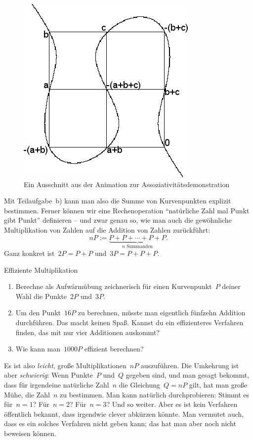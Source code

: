 \documentclass{zirkelblatt}
\begin{document}
\begin{figure}[t]
  \centering
  \includegraphics[scale=0.4]{elliptic-curve-associativity}
  \caption{Ein Ausschnitt aus der Animation zur Assoziativitätsdemonstration}
\end{figure}

Mit Teilaufgabe~b) kann man also die Summe von Kurvenpunkten explizit
bestimmen. Ferner können wir eine Rechenoperation "`natürliche Zahl mal Punkt
gibt Punkt"' definieren -- und zwar genau so, wie man auch die gewöhnliche
Multiplikation von Zahlen auf die Addition von Zahlen zurückführt:
\[ n P := \underbrace{P + P + \cdots + P + P}_{\text{$n$ Summanden}}. \]
Ganz konkret ist~$2 P = P + P$ und~$3 P = P + P + P$.

\begin{aufgabeShaded}{Effiziente Multiplikation}
\begin{enumerate}
\item Berechne als Aufwärmübung zeichnerisch für einen Kurvenpunkt~$P$ deiner Wahl die
Punkte~$2P$ und~$3P$.
\item Um den Punkt~$16P$ zu berechnen, müsste man eigentlich fünfzehn Addition
durchführen. Das macht keinen Spaß. Kannst du ein effizienteres Verfahren
finden, das mit nur vier Additionen auskommt?
\item Wie kann man~$1000P$ effizient berechnen?
\end{enumerate}
\end{aufgabeShaded}

Es ist also \emph{leicht}, große Multiplikationen~$nP$ auszuführen. Die
Umkehrung ist aber \emph{schwierig}: Wenn Punkte~$P$ und~$Q$ gegeben sind, und
man gesagt bekommt, dass für irgendeine natürliche Zahl~$n$ die Gleichung~$Q =
nP$ gilt, hat man große Mühe, die Zahl~$n$ zu bestimmen. Man kann natürlich
durchprobieren: Stimmt es für~$n = 1$? Für~$n = 2$? Für~$n = 3$? Und so weiter.
Aber es ist kein Verfahren öffentlich bekannt, dass irgendwie clever abkürzen
könnte. Man vermutet auch, dass es ein solches Verfahren nicht geben kann; das
hat man aber noch nicht beweisen können.
\end{document}
